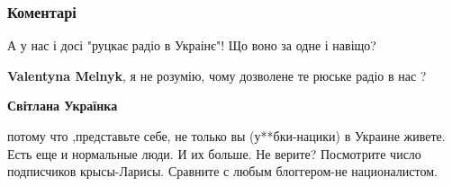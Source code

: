  
 
 
 
 
\subsubsection{Коментарі}
\label{sec:28_07_2021.fb.nicoj_larisa.1.grin_grey_mova.cmt}

\begin{itemize}
 
А у нас і досі "руцкає радіо в Украінє"! Що воно за одне і навіщо?

\begin{itemize}
 
\textbf{Valentyna Melnyk}, я не розумію, чому дозволене те рюське радіо в нас ?

\begin{itemize}
 
\textbf{Світлана Українка} 

потому что ,представьте себе, не только вы (у**бки-нацики) в Украине живете.
Есть еще и нормальные люди. И их больше. Не верите? Посмотрите число
подписчиков крысы-Ларисы. Сравните с любым блоггером-не националистом.

\end{itemize}

\end{itemize}

 

\end{itemize}
